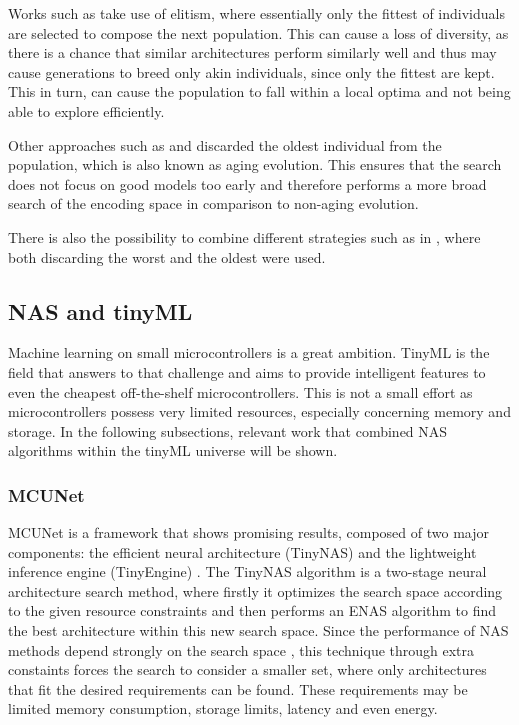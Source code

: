 \documentclass[10pt,        %
               a4paper,     %
               journal,     %
               ]{IEEEtran}
\begin{document}
Works such as \cite{elsken2017simple} take use of elitism, where essentially only the fittest of individuals are selected to
compose the next population. This can cause a loss of diversity, as there is a chance that similar architectures perform
similarly well and thus may cause generations to breed only akin individuals, since only the fittest are kept. This in turn,
can cause the population to fall within a local optima and not being able to explore efficiently.

Other approaches such as \cite{pmlr-v70-real17a} and \cite{zhang2019identify} discarded the oldest individual from the population,
which is also known as aging evolution. This ensures that the search does not focus on good models too early and therefore
performs a more broad search of the encoding space in comparison to non-aging evolution.

There is also the possibility to combine different strategies such as in \cite{zhu2019eena}, where both discarding the worst and the oldest
were used.

\subsection{NAS and tinyML}
\label{nasml}
Machine learning on small microcontrollers is a great ambition. TinyML is the field that answers to that challenge
and aims to provide intelligent features to even the cheapest off-the-shelf microcontrollers. This is not a
small effort as microcontrollers possess very limited resources, especially concerning memory and storage. In the following
subsections, relevant work that combined NAS algorithms within the tinyML universe will be shown.

\subsubsection{\textbf{MCUNet}}
MCUNet is a framework that shows promising results, composed of
two major components: the efficient neural architecture (TinyNAS) and the lightweight inference engine (TinyEngine) \cite{lin2020mcunet}.
The TinyNAS algorithm is a two-stage neural architecture search method, where firstly it optimizes the search space according to the
given resource constraints and then performs an ENAS algorithm to find the best architecture within this new search space.
Since the performance of NAS methods depend strongly on the search space \cite{radosavovic2020designing}, this technique
through extra constaints forces the search to consider a smaller set, where only architectures that fit the desired requirements
can be found. These requirements may be limited memory consumption, storage limits, latency and even energy.
\end{document}
